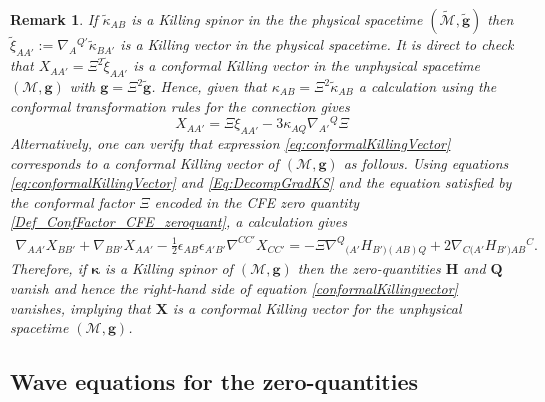 \documentclass[10pt,a4paper]{article}
\theoremstyle{plain}
\newtheorem{remark}{Remark}
\def\bmg{{\bm g}}
\def\bmH{{\bm H}}
\def\bmQ{{\bm Q}}
\def\bmX{{\bm X}}
\begin{document}
\begin{remark} \emph{
  If $\tilde{\kappa}_{AB}$ is a Killing spinor in the the physical
  spacetime $(\tilde{\mathcal{M}},\tilde{\bmg})$ then
  $\tilde{\xi}_{AA'} := \nabla_A{}^{Q'}\tilde{\kappa}_{BA'}$ is a
  Killing vector in the physical spacetime.  It is direct to check
  that $X_{AA'}=\Xi^2 \tilde{\xi}_{AA'}$ is a conformal Killing vector
  in the unphysical spacetime $(\mathcal{M},\bmg)$ with
  $\bmg=\Xi^2\tilde{\bmg}$.  Hence, given that
  $\kappa_{AB}=\Xi^{2}\tilde{\kappa}_{AB}$ a calculation using the
  conformal transformation rules for the connection gives
\begin{equation}\label{eq:conformalKillingVector}
X_{AA'}=\Xi \xi_{AA'} - 3 \kappa_{AQ}\nabla_{A'}{}^{Q}\Xi
\end{equation}
Alternatively, one can verify that expression \eqref{eq:conformalKillingVector}
corresponds to a conformal Killing vector of $(\mathcal{M},\bmg)$ as follows.
Using equations \eqref{eq:conformalKillingVector} and
\eqref{Eq:DecompGradKS} and the equation satisfied by the conformal
factor $\Xi$ encoded in the CFE zero quantity
\eqref{Def_ConfFactor_CFE_zeroquant}, a calculation gives
\begin{multline}\label{conformalKillingvector}
  \nabla_{AA'}X_{BB'}+\nabla_{BB'}X_{AA'}-\tfrac{1}{2}\epsilon_{AB}\epsilon_{A'B'}\nabla^{CC'}X_{CC'}
  =-\Xi \nabla^Q{}_{(A'}H_{B')(AB)Q} + 2\nabla_{C(A'}H_{B')AB}{}^{C}.
\end{multline}
Therefore, if $\bm\kappa$ is a Killing spinor of $(\mathcal{M},\bmg)$ then
the zero-quantities $\bmH$ and $\bmQ$ vanish and hence the right-hand
side of equation \eqref{conformalKillingvector} vanishes, implying
that $\bmX$ is a conformal Killing vector for the unphysical spacetime $(\mathcal{M},\bmg)$.  }
\end{remark}

\subsection{Wave equations for the zero-quantities}
\label{Sec:KSWaveEqs}
\end{document}
